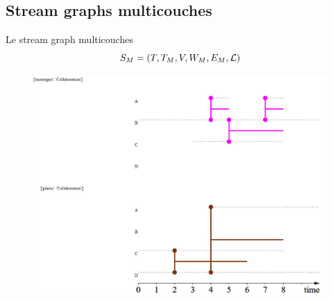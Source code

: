 \documentclass[15pt]{beamer}
\def \stgm {stream graph multicouches}
\def \Stgms {Stream graphs multicouches}
\begin{document}
\subsection{\Stgms{}}
\begin{frame}{Le \stgm{}}
\[
S_M=(T,T_M,V,W_M,E_M,\cal{L})
\]

\begin{figure}
    \centering
    \includegraphics[width=0.7\linewidth]{img/exMultiStream.JPG}
\end{figure}
\end{frame}
\end{document}
